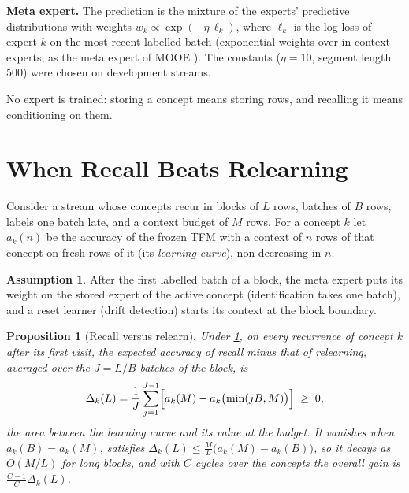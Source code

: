 \documentclass{article}
\theoremstyle{plain}
\newtheorem{proposition}{Proposition}
\theoremstyle{definition}
\newtheorem{assumption}{Assumption}
\theoremstyle{remark}
\begin{document}
\textbf{Meta expert.} The prediction is the mixture of the experts' predictive distributions with weights
$w_k\propto\exp(-\eta\,\ell_k)$, where $\ell_k$ is the log-loss of expert $k$ on the most recent labelled batch
(exponential weights over in-context experts, as the meta expert of MOOE \citep{zhao2025mooe}). The constants
($\eta=10$, segment length 500) were chosen on development streams.

No expert is trained: storing a concept means storing rows, and recalling it means conditioning on them.

\section{When Recall Beats Relearning}
\label{sec:theory}

Consider a stream whose concepts recur in blocks of $L$ rows, batches of $B$ rows, labels one batch late, and a
context budget of $M$ rows. For a concept $k$ let $a_k(n)$ be the accuracy of the frozen TFM with a context of $n$ rows
of that concept on fresh rows of it (its \emph{learning curve}), non-decreasing in $n$.

\begin{assumption}\label{ass:id}
After the first labelled batch of a block, the meta expert puts its weight on the stored expert of the active
concept (identification takes one batch), and a reset learner (drift detection) starts its context at the block
boundary.
\end{assumption}

\begin{proposition}[Recall versus relearn]\label{prop:recall}
Under \cref{ass:id}, on every recurrence of concept $k$ after its first visit, the expected accuracy of recall minus
that of relearning, averaged over the $J=L/B$ batches of the block, is
\[
  \Delta_k(L)=\frac1J\sum_{j=1}^{J-1}\Bigl[a_k(M)-a_k\bigl(\min(jB,M)\bigr)\Bigr]\;\ge\;0,
\]
the area between the learning curve and its value at the budget. It vanishes when $a_k(B)=a_k(M)$, satisfies
$\Delta_k(L)\le\frac{M}{L}\bigl(a_k(M)-a_k(B)\bigr)$, so it decays as $O(M/L)$ for long blocks, and with $C$ cycles
over the concepts the overall gain is $\frac{C-1}{C}\Delta_k(L)$.
\end{proposition}
\end{document}
